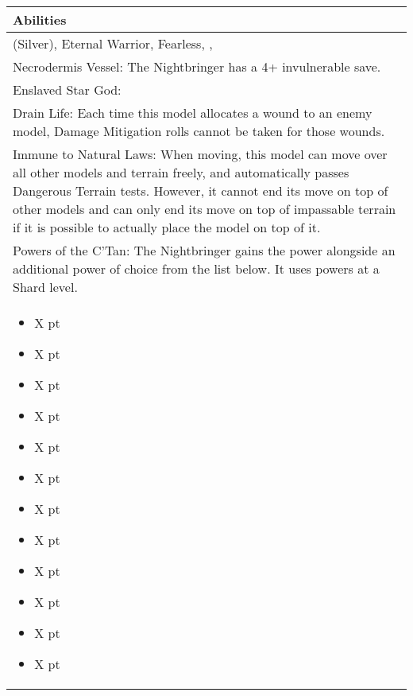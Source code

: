 \noindent
\begin{tabular}{||m{532pt}||}
	\hline
	Abilities \\
	\hline
	\quickref{Awakening Protocols} (Silver), Eternal Warrior, Fearless, \quickref{Living Metal}, \quickref{Reanimation Protocols} \\
	Necrodermis Vessel: The Nightbringer has a 4+ invulnerable save. \\
	Enslaved Star God:  \\
	Drain Life: Each time this model allocates a wound to an enemy model, Damage Mitigation rolls cannot be taken for those wounds. \\
	Immune to Natural Laws: When moving, this model can move over all other models and terrain 	freely, and automatically passes Dangerous Terrain tests. However, it 	cannot end its move on top of other models and can only end its move on top of impassable terrain if it is possible to actually place the model on top of it. \\
	Powers of the C'Tan: The Nightbringer gains the \quickref{Gaze of Death} power alongside an additional power of choice from the list below. It uses powers at a Shard level. \\
	\begin{itemize}
		\item \quickref{Antimatter Meteor} \hrulefill X pt
		\item \quickref{Cosmic Fire} \hrulefill X pt
		\item \quickref{Entropic Touch} \hrulefill X pt
		\item \quickref{Moulder of Worlds} \hrulefill X pt
		\item \quickref{Pyreshards} \hrulefill X pt
		\item \quickref{Sentient Singularity} \hrulefill X pt
		\item \quickref{Seismic Assault} \hrulefill X pt
		\item \quickref{Sky of Falling Stars} \hrulefill X pt
		\item \quickref{Swarm of Spirit Dust} \hrulefill X pt
		\item \quickref{Time's Arrow} \hrulefill X pt
		\item \quickref{Transdimensional Thunderbolt} \hrulefill X pt
		\item \quickref{Withering Worldscape} \hrulefill X pt
	\end{itemize} \\
	\hline
\end{tabular}




